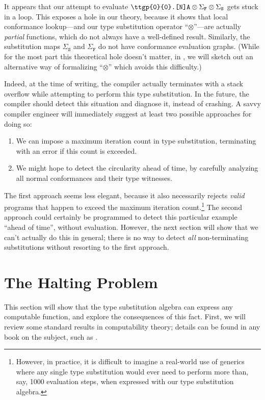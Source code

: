 \documentclass[../generics]{subfiles}
\begin{document}
It appears that our attempt to evaluate $\texttt{\ttgp{0}{0}.[N]A}\otimes \Sigma_\texttt{F}\otimes\Sigma_\texttt{S}$ gets stuck in a loop. This exposes a hole in our theory, because it shows that local conformance lookup---and our type substitution operator ``$\otimes$''---are actually \emph{partial} functions, which do not always have a well-defined result. Similarly, the substitution maps $\Sigma_\texttt{S}$ and $\Sigma_\texttt{F}$ do not have conformance evaluation graphs. (While for the most part this theoretical hole doesn't matter, in , we will sketch out an alternative way of formalizing ``$\otimes$'' which avoids this difficulty.)

Indeed, at the time of writing, the compiler actually terminates with a stack overflow while attempting to perform this type substitution. In the future, the compiler should detect this situation and diagnose it, instead of crashing. A savvy compiler engineer will immediately suggest at least two possible approaches for doing so:
\begin{enumerate}
\item We can impose a maximum iteration count in type substitution, terminating with an error if this count is exceeded.
\item We might hope to detect the circularity ahead of time, by carefully analyzing all normal conformances and their type witnesses.
\end{enumerate}
The first approach seems less elegant, because it also necessarily rejects \emph{valid} programs that happen to exceed the maximum iteration count.\footnote{However, in practice, it is difficult to imagine a real-world use of generics where any single type substitution would ever need to perform more than, say, 1000 evaluation steps, when expressed with our type substitution algebra.} The second approach could certainly be programmed to detect this particular example ``ahead of time'', without evaluation. However, the next section will show that we can't actually do this in general; there is no way to detect \emph{all} non-terminating substitutions without resorting to the first approach.

\section{The Halting Problem}\label{tag systems}

This section will show that the type substitution algebra can express any computable function, and explore the consequences of this fact. First, we will review some standard results in computability theory; details can be found in any book on the subject, such as \cite{cutland}.
\end{document}
